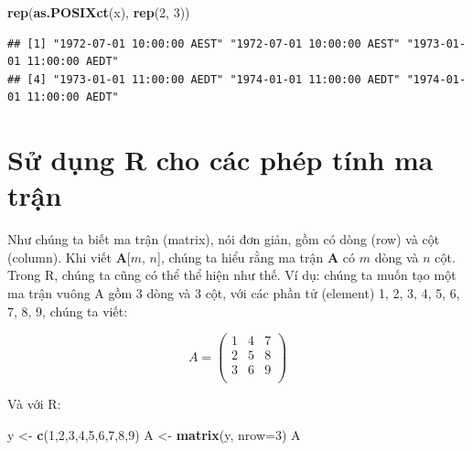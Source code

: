 \documentclass[
]{book}
\newenvironment{Shaded}{\begin{snugshade}}{\end{snugshade}}
\newcommand{\DataTypeTok}[1]{\textcolor[rgb]{0.13,0.29,0.53}{#1}}
\newcommand{\DecValTok}[1]{\textcolor[rgb]{0.00,0.00,0.81}{#1}}
\newcommand{\KeywordTok}[1]{\textcolor[rgb]{0.13,0.29,0.53}{\textbf{#1}}}
\newcommand{\NormalTok}[1]{#1}
\newcommand{\StringTok}[1]{\textcolor[rgb]{0.31,0.60,0.02}{#1}}
\begin{document}
\begin{itemize}
\begin{Shaded}
\begin{Highlighting}[]
\KeywordTok{rep}\NormalTok{(}\KeywordTok{as.POSIXct}\NormalTok{(x), }\KeywordTok{rep}\NormalTok{(}\DecValTok{2}\NormalTok{, }\DecValTok{3}\NormalTok{))}
\end{Highlighting}
\end{Shaded}

\begin{verbatim}
## [1] "1972-07-01 10:00:00 AEST" "1972-07-01 10:00:00 AEST" "1973-01-01 11:00:00 AEDT"
## [4] "1973-01-01 11:00:00 AEDT" "1974-01-01 11:00:00 AEDT" "1974-01-01 11:00:00 AEDT"
\end{verbatim}
\end{itemize}

\hypertarget{sux1eed-dux1ee5ng-r-cho-cuxe1c-phuxe9p-tuxednh-ma-trux1eadn}{%
\section{Sử dụng R cho các phép tính ma trận}\label{sux1eed-dux1ee5ng-r-cho-cuxe1c-phuxe9p-tuxednh-ma-trux1eadn}}

Như chúng ta biết ma trận (matrix), nói đơn giản, gồm có dòng (row) và cột (column). Khi viết \textbf{A}{[}\(m\), \(n\){]}, chúng ta hiểu rằng ma trận \textbf{A} có \(m\) dòng và \(n\) cột. Trong R, chúng ta cũng có thể thể hiện như thế. Ví dụ: chúng ta muốn tạo một ma trận vuông A gồm 3 dòng và 3 cột, với các phần tử (element) 1, 2, 3, 4, 5, 6, 7, 8, 9, chúng ta viết:

\[A = \begin{pmatrix}
1 & 4 & 7 \\
2 & 5 & 8 \\
3 & 6 & 9 \\
\end{pmatrix}\]

Và với R:

\begin{Shaded}
\begin{Highlighting}[]
\NormalTok{y \textless{}{-}}\StringTok{ }\KeywordTok{c}\NormalTok{(}\DecValTok{1}\NormalTok{,}\DecValTok{2}\NormalTok{,}\DecValTok{3}\NormalTok{,}\DecValTok{4}\NormalTok{,}\DecValTok{5}\NormalTok{,}\DecValTok{6}\NormalTok{,}\DecValTok{7}\NormalTok{,}\DecValTok{8}\NormalTok{,}\DecValTok{9}\NormalTok{)}
\NormalTok{A \textless{}{-}}\StringTok{ }\KeywordTok{matrix}\NormalTok{(y, }\DataTypeTok{nrow=}\DecValTok{3}\NormalTok{)}
\NormalTok{A}
\end{Highlighting}
\end{Shaded}
\end{document}
